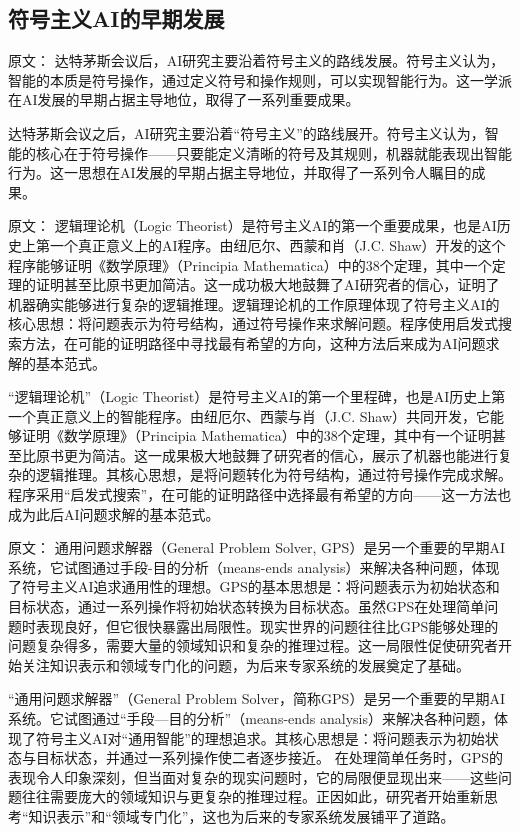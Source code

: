 \subsection{符号主义AI的早期发展}

原文：
达特茅斯会议后，AI研究主要沿着符号主义的路线发展。符号主义认为，智能的本质是符号操作，通过定义符号和操作规则，可以实现智能行为。这一学派在AI发展的早期占据主导地位，取得了一系列重要成果。

达特茅斯会议之后，AI研究主要沿着“符号主义”的路线展开。符号主义认为，智能的核心在于符号操作——只要能定义清晰的符号及其规则，机器就能表现出智能行为。这一思想在AI发展的早期占据主导地位，并取得了一系列令人瞩目的成果。

原文：
逻辑理论机（Logic Theorist）是符号主义AI的第一个重要成果，也是AI历史上第一个真正意义上的AI程序。由纽厄尔、西蒙和肖（J.C. Shaw）开发的这个程序能够证明《数学原理》（Principia Mathematica）中的38个定理，其中一个定理的证明甚至比原书更加简洁。这一成功极大地鼓舞了AI研究者的信心，证明了机器确实能够进行复杂的逻辑推理。逻辑理论机的工作原理体现了符号主义AI的核心思想：将问题表示为符号结构，通过符号操作来求解问题。程序使用启发式搜索方法，在可能的证明路径中寻找最有希望的方向，这种方法后来成为AI问题求解的基本范式。

“逻辑理论机”（Logic Theorist）是符号主义AI的第一个里程碑，也是AI历史上第一个真正意义上的智能程序。由纽厄尔、西蒙与肖（J.C. Shaw）共同开发，它能够证明《数学原理》（Principia Mathematica）中的38个定理，其中有一个证明甚至比原书更为简洁。这一成果极大地鼓舞了研究者的信心，展示了机器也能进行复杂的逻辑推理。其核心思想，是将问题转化为符号结构，通过符号操作完成求解。程序采用“启发式搜索”，在可能的证明路径中选择最有希望的方向——这一方法也成为此后AI问题求解的基本范式。

原文：
通用问题求解器（General Problem Solver, GPS）是另一个重要的早期AI系统，它试图通过手段-目的分析（means-ends analysis）来解决各种问题，体现了符号主义AI追求通用性的理想。GPS的基本思想是：将问题表示为初始状态和目标状态，通过一系列操作将初始状态转换为目标状态。虽然GPS在处理简单问题时表现良好，但它很快暴露出局限性。现实世界的问题往往比GPS能够处理的问题复杂得多，需要大量的领域知识和复杂的推理过程。这一局限性促使研究者开始关注知识表示和领域专门化的问题，为后来专家系统的发展奠定了基础。

“通用问题求解器”（General Problem Solver，简称GPS）是另一个重要的早期AI系统。它试图通过“手段—目的分析”（means-ends analysis）来解决各种问题，体现了符号主义AI对“通用智能”的理想追求。其核心思想是：将问题表示为初始状态与目标状态，并通过一系列操作使二者逐步接近。  
在处理简单任务时，GPS的表现令人印象深刻，但当面对复杂的现实问题时，它的局限便显现出来——这些问题往往需要庞大的领域知识与更复杂的推理过程。正因如此，研究者开始重新思考“知识表示”和“领域专门化”，这也为后来的专家系统发展铺平了道路。

